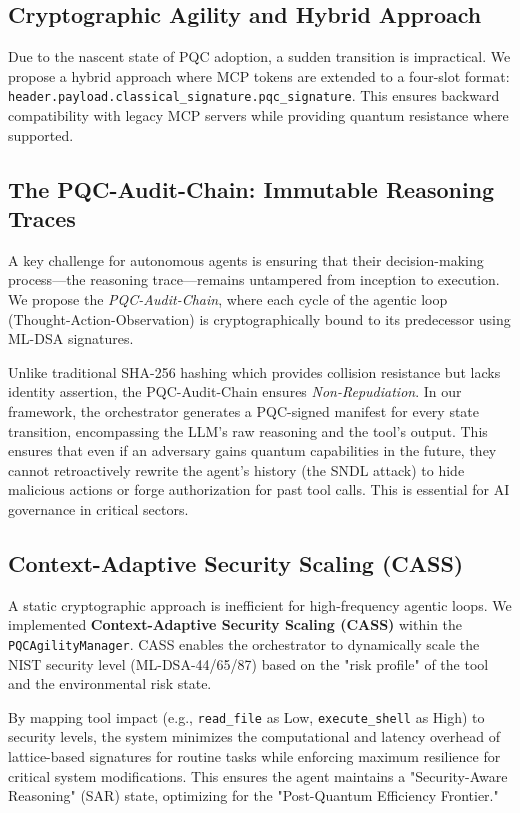 \documentclass[conference]{IEEEtran}
\begin{document}
\subsection{Cryptographic Agility and Hybrid Approach}
Due to the nascent state of PQC adoption, a sudden transition is impractical. We propose a hybrid approach where MCP tokens are extended to a four-slot format: \texttt{header.payload.\allowbreak classical\_signature.\allowbreak pqc\_signature}. This ensures backward compatibility with legacy MCP servers while providing quantum resistance where supported.

\subsection{The PQC-Audit-Chain: Immutable Reasoning Traces}
A key challenge for autonomous agents is ensuring that their decision-making process—the reasoning trace—remains untampered from inception to execution. We propose the \textit{PQC-Audit-Chain}, where each cycle of the agentic loop (Thought-Action-Observation) is cryptographically bound to its predecessor using ML-DSA signatures. 

Unlike traditional SHA-256 hashing which provides collision resistance but lacks identity assertion, the PQC-Audit-Chain ensures \textit{Non-Repudiation}. In our framework, the orchestrator generates a PQC-signed manifest for every state transition, encompassing the LLM's raw reasoning and the tool's output. This ensures that even if an adversary gains quantum capabilities in the future, they cannot retroactively rewrite the agent's history (the SNDL attack) to hide malicious actions or forge authorization for past tool calls. This is essential for AI governance in critical sectors.

\subsection{Context-Adaptive Security Scaling (CASS)}
A static cryptographic approach is inefficient for high-frequency agentic loops. We implemented \textbf{Context-Adaptive Security Scaling (CASS)} within the \texttt{PQCAgilityManager}. CASS enables the orchestrator to dynamically scale the NIST security level (ML-DSA-44/65/87) based on the "risk profile" of the tool and the environmental risk state. 

By mapping tool impact (e.g., \texttt{read\_file} as Low, \texttt{execute\_shell} as High) to security levels, the system minimizes the computational and latency overhead of lattice-based signatures for routine tasks while enforcing maximum resilience for critical system modifications. This ensures the agent maintains a "Security-Aware Reasoning" (SAR) state, optimizing for the "Post-Quantum Efficiency Frontier."
\end{document}
